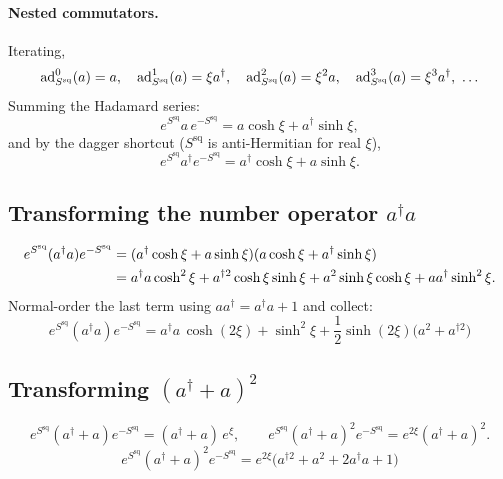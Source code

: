 \documentclass[../main.tex]{subfiles}
\begin{document}
\paragraph{Nested commutators.} Iterating,
\begin{equation}
\mathrm{ad}_{S^{\mathrm{sq}}}^0(a)=a,\quad \mathrm{ad}_{S^{\mathrm{sq}}}^1(a)=\xi a^\dagger,\quad
\mathrm{ad}_{S^{\mathrm{sq}}}^2(a)=\xi^2 a,\quad
\mathrm{ad}_{S^{\mathrm{sq}}}^3(a)=\xi^3a^\dagger,\ \ldots
\end{equation}
Summing the Hadamard series:
\begin{equation}
e^{S^{\mathrm{sq}}}a\,e^{-S^{\mathrm{sq}}}=a\cosh\xi+a^\dagger\sinh\xi, \label{eq:aT}
\end{equation}
and by the dagger shortcut ($S^{\mathrm{sq}}$ is anti-Hermitian for real $\xi$),
\begin{equation}
e^{S^{\mathrm{sq}}}a^\dagger e^{-S^{\mathrm{sq}}}=a^\dagger\cosh\xi+a\sinh\xi. \label{eq:adagT}
\end{equation}

\subsection{Transforming the number operator \texorpdfstring{$a^\dagger a$}{adag a}}

\begin{align}
e^{S^{\mathrm{sq}}}(a^\dagger a)e^{-S^{\mathrm{sq}}}
&=(a^\dagger\cosh\xi+a\sinh\xi)(a\cosh\xi+a^\dagger\sinh\xi)\notag\\
&=a^\dagger a\cosh^2\xi+a^{\dagger2}\cosh\xi\sinh\xi+a^2\sinh\xi\cosh\xi+aa^\dagger\sinh^2\xi.
\end{align}
Normal-order the last term using $aa^\dagger=a^\dagger a+1$ and collect:
\begin{equation}
\boxed{\,e^{S^{\mathrm{sq}}}(a^\dagger a)e^{-S^{\mathrm{sq}}}=a^\dagger a\,\cosh(2\xi)+\sinh^2\xi+\frac12\sinh(2\xi)\big(a^2+a^{\dagger2}\big)\,}
\label{eq:numtransform}
\end{equation}

\subsection{Transforming \texorpdfstring{$(a^\dagger+a)^2$}{(adag+a)\^2}}

\begin{equation}
e^{S^{\mathrm{sq}}}(a^\dagger+a)e^{-S^{\mathrm{sq}}}=(a^\dagger+a)\,e^{\xi},
\qquad
e^{S^{\mathrm{sq}}}(a^\dagger+a)^2e^{-S^{\mathrm{sq}}}=e^{2\xi}(a^\dagger+a)^2.
\end{equation}
\begin{equation}
\boxed{\,e^{S^{\mathrm{sq}}}(a^\dagger+a)^2e^{-S^{\mathrm{sq}}}=e^{2\xi}\big(a^{\dagger2}+a^2+2a^\dagger a+1\big)\,}
\label{eq:sqtransform}
\end{equation}
\end{document}
